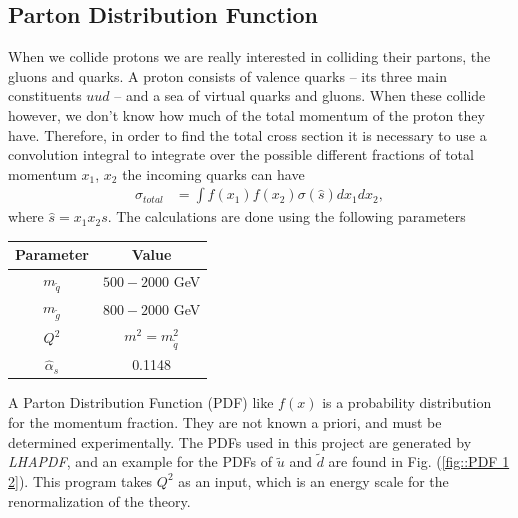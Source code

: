 \documentclass[11pt]{article}
\begin{document}
\subsection*{Parton Distribution Function}
\begin{flushleft}
When we collide protons we are really interested in colliding their partons, the gluons and quarks. A proton consists of valence quarks -- its three main constituents $uud$ -- and a sea of virtual quarks and gluons. When these collide however, we don't know how much of the total momentum of the proton they have. Therefore, in order to find the total cross section it is necessary to use a convolution integral to integrate over the possible different fractions of total momentum $x_1$, $x_2$ the incoming quarks can have
\begin{align*}
\sigma_{total} &= \int f(x_1) f(x_2) \sigma(\hat{s}) dx_1 dx_2,
\end{align*}
where $\hat{s} = x_1 x_2 s$. The calculations are done using the following parameters
\begin{table}[H]
\centering
\begin{tabular}{|c|c|}
\hline
Parameter & Value\\
\hline
$m_{\tilde{q}}$ & $500-2000$ GeV\\
$m_{\tilde{g}}$ & $800-2000$ GeV\\
$Q^2$ & $m^2=m_{\tilde{q}}^2$\\
$\hat{\alpha}_s$ & 0.1148 \\
\hline
\end{tabular}
\end{table}
A Parton Distribution Function (PDF) like $f(x)$ is a probability distribution for the momentum fraction. They are not known a priori, and must be determined experimentally. The PDFs used in this project are generated by \textit{LHAPDF}, and an example for the PDFs of $\tilde{u}$ and $\tilde{d}$ are found in Fig. (\ref{fig::PDF 1 2}). This program takes $Q^2$ as an input, which is an energy scale for the renormalization of the theory.
\end{flushleft}
\end{document}
